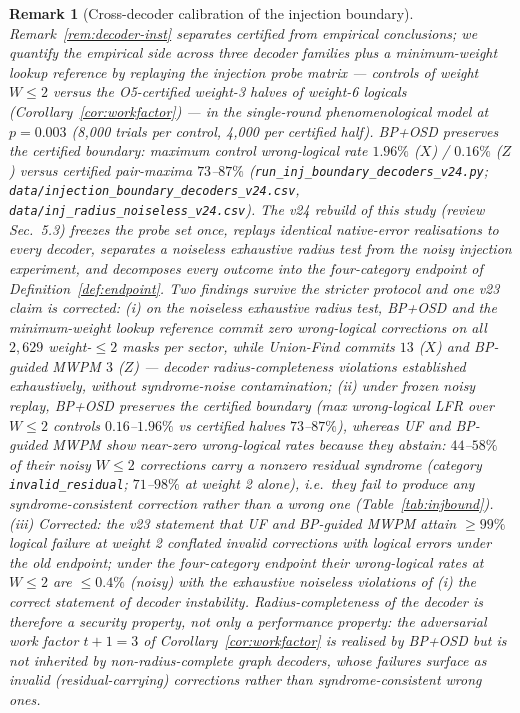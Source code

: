 \documentclass[11pt,a4paper]{article}
\newtheorem{remark}{Remark}
\begin{document}
\begin{remark}[Cross-decoder calibration of the injection boundary]
\label{rem:crossdec}
Remark~\ref{rem:decoder-inst} separates certified from empirical
conclusions; we quantify the empirical side across three decoder
families plus a minimum-weight lookup reference by replaying the
injection probe matrix --- controls of weight $W\le2$ versus the
O5-certified weight-3 halves of weight-6 logicals
(Corollary~\ref{cor:workfactor}) --- in the single-round phenomenological
model at $p=0.003$ (8{,}000 trials per control, 4{,}000 per certified
half). BP+OSD preserves the
certified boundary: maximum control wrong-logical rate $1.96\%$ ($X$) /
$0.16\%$ ($Z$)
versus certified pair-maxima $73$--$87\%$
(\texttt{run\_inj\_boundary\_decoders\_v24.py};
\texttt{data/injection\_boundary\_decoders\_v24.csv},
\texttt{data/inj\_radius\_noiseless\_v24.csv}).
The v24 rebuild of this study (review Sec.~5.3) freezes the probe set
once, replays \emph{identical} native-error realisations to every
decoder, separates a noiseless exhaustive radius test from the noisy
injection experiment, and decomposes every outcome into the
four-category endpoint of Definition~\ref{def:endpoint}. Two findings
survive the stricter protocol and one v23 claim is corrected:
\emph{(i)} on the noiseless exhaustive radius test, BP+OSD and the
minimum-weight lookup reference commit zero wrong-logical corrections
on all $2{,}629$ weight-$\le2$ masks per sector, while Union-Find
commits $13$ ($X$) and BP-guided MWPM $3$ ($Z$) --- decoder
radius-completeness violations established exhaustively, without
syndrome-noise contamination;
\emph{(ii)} under frozen noisy replay, BP+OSD preserves the certified
boundary (max wrong-logical LFR over $W\le2$ controls $0.16$--$1.96\%$
vs certified halves $73$--$87\%$), whereas UF and BP-guided MWPM show
near-zero wrong-logical rates \emph{because they abstain}:
$44$--$58\%$ of their noisy $W\le2$ corrections carry a nonzero
residual syndrome (category \texttt{invalid\_residual}; $71$--$98\%$
at weight 2 alone), i.e.\ they fail to produce any
syndrome-consistent correction rather than a wrong one
(Table~\ref{tab:injbound}).
\emph{(iii) Corrected:} the v23 statement that UF and BP-guided MWPM
attain $\ge99\%$ logical failure at weight 2 conflated invalid
corrections with logical errors under the old endpoint; under the
four-category endpoint their wrong-logical rates at $W\le2$ are
$\le0.4\%$ (noisy) with the exhaustive noiseless violations of (i) the
correct statement of decoder instability.
Radius-completeness of the decoder is therefore a \emph{security}
property, not only a performance property: the adversarial work factor
$t{+}1=3$ of Corollary~\ref{cor:workfactor} is realised by BP+OSD but
is not inherited by non-radius-complete graph decoders, whose failures
surface as invalid (residual-carrying) corrections rather than
syndrome-consistent wrong ones.
\end{remark}
\end{document}

